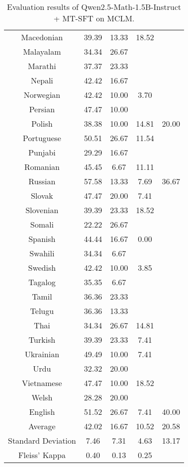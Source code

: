 \begin{table*}[]
\begin{tabular}{c|cccc}
Macedonian & 39.39 & 13.33 & 18.52 &  \\
Malayalam & 34.34 & 26.67 & \multicolumn{1}{l}{} &  \\
Marathi & 37.37 & 23.33 & \multicolumn{1}{l}{} &  \\
Nepali & 42.42 & 16.67 & \multicolumn{1}{l}{} &  \\
Norwegian & 42.42 & 10.00 & 3.70 &  \\
Persian & 47.47 & 10.00 & \multicolumn{1}{l}{} &  \\
Polish & 38.38 & 10.00 & 14.81 & 20.00 \\
Portuguese & 50.51 & 26.67 & 11.54 &  \\
Punjabi & 29.29 & 16.67 & \multicolumn{1}{l}{} &  \\
Romanian & 45.45 & 6.67 & 11.11 &  \\
Russian & 57.58 & 13.33 & 7.69 & 36.67 \\
Slovak & 47.47 & 20.00 & 7.41 &  \\
Slovenian & 39.39 & 23.33 & 18.52 &  \\
Somali & 22.22 & 26.67 & \multicolumn{1}{l}{} &  \\
Spanish & 44.44 & 16.67 & 0.00 &  \\
Swahili & 34.34 & 6.67 & \multicolumn{1}{l}{} &  \\
Swedish & 42.42 & 10.00 & 3.85 &  \\
Tagalog & 35.35 & 6.67 & \multicolumn{1}{l}{} &  \\
Tamil & 36.36 & 23.33 & \multicolumn{1}{l}{} &  \\
Telugu & 36.36 & 13.33 & \multicolumn{1}{l}{} &  \\
Thai & 34.34 & 26.67 & 14.81 &  \\
Turkish & 39.39 & 23.33 & 7.41 &  \\
Ukrainian & 49.49 & 10.00 & 7.41 &  \\
Urdu & 32.32 & 20.00 & \multicolumn{1}{l}{} &  \\
Vietnamese & 47.47 & 10.00 & 18.52 &  \\
Welsh & 28.28 & 20.00 & \multicolumn{1}{l}{} &  \\
\rowcolor[HTML]{FCE5CD} 
English & 51.52 & 26.67 & 7.41 & 40.00 \\ \midrule
Average & 42.02 & 16.67 & 10.52 & 20.58 \\
Standard Deviation & 7.46 & 7.31 & 4.63 & 13.17 \\
Fleiss' Kappa & 0.40 & 0.13 & 0.25 & \\ \bottomrule
\end{tabular}
\caption{\footnotesize Evaluation results of Qwen2.5-Math-1.5B-Instruct + MT-SFT on MCLM.}
\label{tab:qwen_math_1_5B_mt_sft}
\end{table*}

